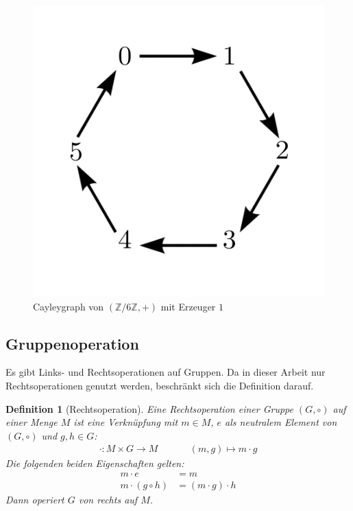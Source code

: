 \documentclass[12pt,a4paper, usenames, dvipsnames]{article}
\theoremstyle{mystyle}
\newtheorem{definition}{Definition}
\theoremstyle{definition}
\begin{document}
\begin{figure}[H]
\centering
\includegraphics[scale=0.7]{Cayleygraph3.png}
\caption{Cayleygraph von $(\mathbb{Z}/6\mathbb{Z}, +)$ mit Erzeuger $1$}
\label{Abbildung_Cayleygraph}
\end{figure}


%
%
%
%
%
%
%
%
%
%

\subsection{Gruppenoperation}
 \label{Abschnitt_Gruppenoperation}



Es gibt Links- und Rechtsoperationen auf Gruppen. Da in dieser Arbeit nur Rechtsoperationen genutzt werden, beschränkt sich die Definition darauf.


\begin{definition}[Rechtsoperation]

Eine Rechtsoperation einer Gruppe $(G, \circ)$ auf einer Menge $M$ ist eine Verknüpfung mit $m \in M$, $e$ als neutralem Element von $(G,\circ)$ und $g,h \in G$:
\begin{align*}
\cdot: M \times G \rightarrow M \ \ \ \ \ \ \ \ \ \ \ \ \ \ \
(m, g) \mapsto m \cdot g 
\end{align*}
Die folgenden beiden Eigenschaften gelten:
\begin{align*}
m \cdot e & = m \\
m \cdot (g \circ h) & = (m \cdot g) \cdot h
\end{align*}
Dann operiert $G$ von rechts auf $M$.

\end{definition}
\end{document}

